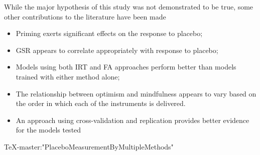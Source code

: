 While the major hypothesis of this study was not demonstrated to be
true, some other contributions to the literature have been made
\begin{itemize}
\item Priming exerts significant effects on the response to placebo;
\item GSR appears to correlate appropriately with response to placebo;
\item Models using both IRT and FA approaches perform better than
models trained with either method alone;
\item The relationship between optimism and mindfulness appears to
vary based on the order in which each of the instruments is delivered.
\item An approach using cross-validation and replication provides
better evidence for the models tested
\end{itemize}

TeX-master:"PlaceboMeasurementByMultipleMethods" %